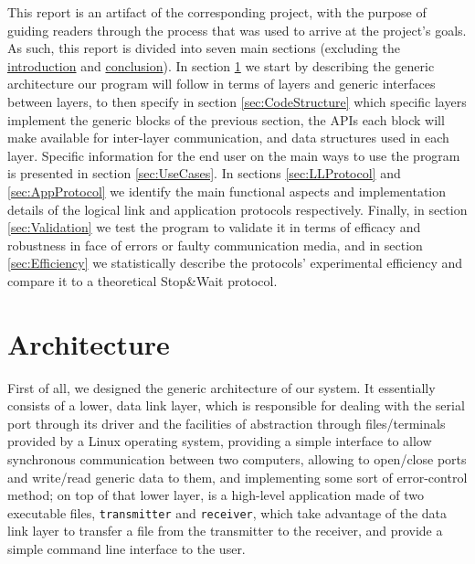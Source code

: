 \documentclass[a4paper, 11pt]{report}
\begin{document}
This report is an artifact of the corresponding project, with the purpose of guiding readers through the process that was used to arrive at the project's goals. As such, this report is divided into seven main sections (excluding the \hyperref[sec:Introduction]{introduction} and \hyperref[sec:Conclusion]{conclusion}). In section \ref{sec:Architecture} we start by describing the generic architecture our program will follow in terms of layers and generic interfaces between layers, to then specify in section \ref{sec:CodeStructure} which specific layers implement the generic blocks of the previous section, the APIs each block will make available for inter-layer communication, and data structures used in each layer. Specific information for the end user on the main ways to use the program is presented in section \ref{sec:UseCases}. In sections \ref{sec:LLProtocol} and \ref{sec:AppProtocol} we identify the main functional aspects and implementation details of the logical link and application protocols respectively. Finally, in section \ref{sec:Validation} we test the program to validate it in terms of efficacy and robustness in face of errors or faulty communication media, and in section \ref{sec:Efficiency} we statistically describe the protocols' experimental efficiency and compare it to a theoretical Stop\&Wait protocol.

\section{Architecture} \label{sec:Architecture}

First of all, we designed the generic architecture of our system. It essentially consists of a lower, data link layer, which is responsible for dealing with the serial port through its driver and the facilities of abstraction through files/terminals provided by a Linux operating system, providing a simple interface to allow synchronous communication between two computers, allowing to open/close ports and write/read generic data to them, and implementing some sort of error-control method; on top of that lower layer, is a high-level application made of two executable files, \texttt{transmitter} and \texttt{receiver}, which take advantage of the data link layer to transfer a file from the transmitter to the receiver, and provide a simple command line interface to the user.
\end{document}
